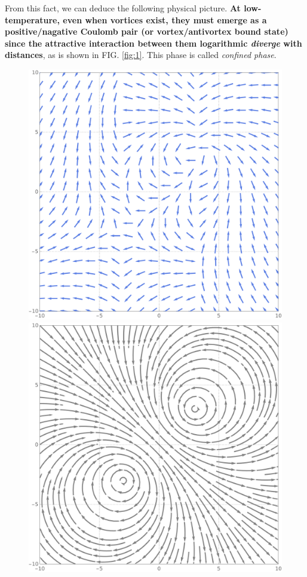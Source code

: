 \documentclass[10pt,nofootinbib]{revtex4}
\begin{document}
		From this fact, we can deduce the following physical picture. \textbf{At low-temperature, even when vortices exist, they must emerge as a positive/nagative Coulomb pair (or vortex/antivortex bound state) since the attractive interaction between them logarithmic \emph{diverge} with distances}, as is shown in FIG. \ref{fig:1}. This phase is called \emph{confined phase}.
		\begin{figure}[!htp]
			\centering
			\includegraphics[scale=0.2]{spin.pdf}
			\includegraphics[scale=0.2]{vector.pdf}

\end{figure}
\end{document}
